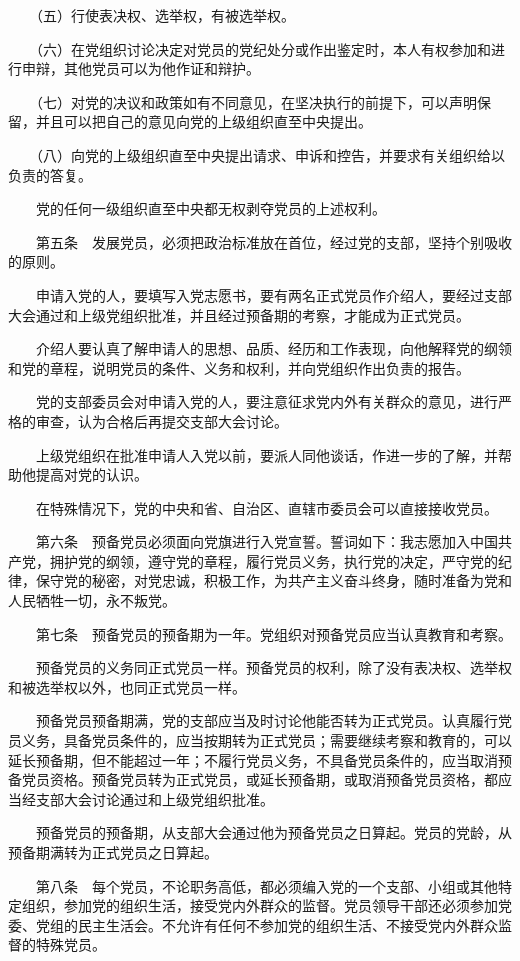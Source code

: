 　　（五）行使表决权、选举权，有被选举权。

　　（六）在党组织讨论决定对党员的党纪处分或作出鉴定时，本人有权参加和进行申辩，其他党员可以为他作证和辩护。

　　（七）对党的决议和政策如有不同意见，在坚决执行的前提下，可以声明保留，并且可以把自己的意见向党的上级组织直至中央提出。

　　（八）向党的上级组织直至中央提出请求、申诉和控告，并要求有关组织给以负责的答复。

　　党的任何一级组织直至中央都无权剥夺党员的上述权利。

　　第五条　发展党员，必须把政治标准放在首位，经过党的支部，坚持个别吸收的原则。

　　申请入党的人，要填写入党志愿书，要有两名正式党员作介绍人，要经过支部大会通过和上级党组织批准，并且经过预备期的考察，才能成为正式党员。

　　介绍人要认真了解申请人的思想、品质、经历和工作表现，向他解释党的纲领和党的章程，说明党员的条件、义务和权利，并向党组织作出负责的报告。

　　党的支部委员会对申请入党的人，要注意征求党内外有关群众的意见，进行严格的审查，认为合格后再提交支部大会讨论。

　　上级党组织在批准申请人入党以前，要派人同他谈话，作进一步的了解，并帮助他提高对党的认识。

　　在特殊情况下，党的中央和省、自治区、直辖市委员会可以直接接收党员。

　　第六条　预备党员必须面向党旗进行入党宣誓。誓词如下：我志愿加入中国共产党，拥护党的纲领，遵守党的章程，履行党员义务，执行党的决定，严守党的纪律，保守党的秘密，对党忠诚，积极工作，为共产主义奋斗终身，随时准备为党和人民牺牲一切，永不叛党。

　　第七条　预备党员的预备期为一年。党组织对预备党员应当认真教育和考察。

　　预备党员的义务同正式党员一样。预备党员的权利，除了没有表决权、选举权和被选举权以外，也同正式党员一样。

　　预备党员预备期满，党的支部应当及时讨论他能否转为正式党员。认真履行党员义务，具备党员条件的，应当按期转为正式党员；需要继续考察和教育的，可以延长预备期，但不能超过一年；不履行党员义务，不具备党员条件的，应当取消预备党员资格。预备党员转为正式党员，或延长预备期，或取消预备党员资格，都应当经支部大会讨论通过和上级党组织批准。

　　预备党员的预备期，从支部大会通过他为预备党员之日算起。党员的党龄，从预备期满转为正式党员之日算起。

　　第八条　每个党员，不论职务高低，都必须编入党的一个支部、小组或其他特定组织，参加党的组织生活，接受党内外群众的监督。党员领导干部还必须参加党委、党组的民主生活会。不允许有任何不参加党的组织生活、不接受党内外群众监督的特殊党员。

